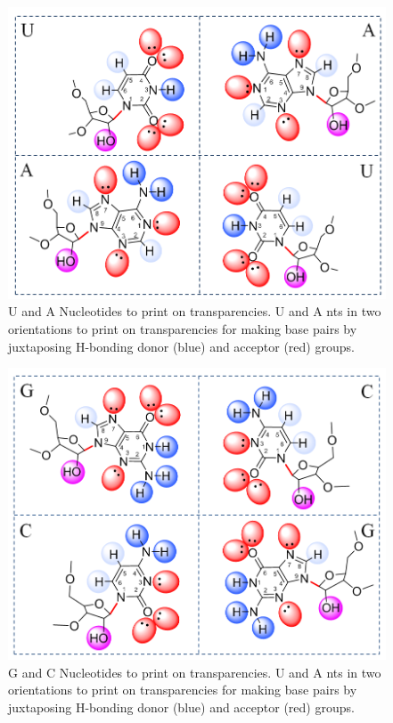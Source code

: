 \begin{figure}
  \includegraphics[width=\linewidth]{chapter-1/figs/ua}
  \caption{U and A Nucleotides to print on transparencies. U and A nts in two
    orientations to print on transparencies for making base pairs by juxtaposing
  H-bonding donor (blue) and acceptor (red) groups.}
\label{fig:ua}
\end{figure}

\begin{figure}
  \includegraphics[width=\linewidth]{chapter-1/figs/gc}
  \caption{G and C Nucleotides to print on transparencies. U and A nts in two
    orientations to print on transparencies for making base pairs by juxtaposing
  H-bonding donor (blue) and acceptor (red) groups.}
\label{fig:gc}
\end{figure}

